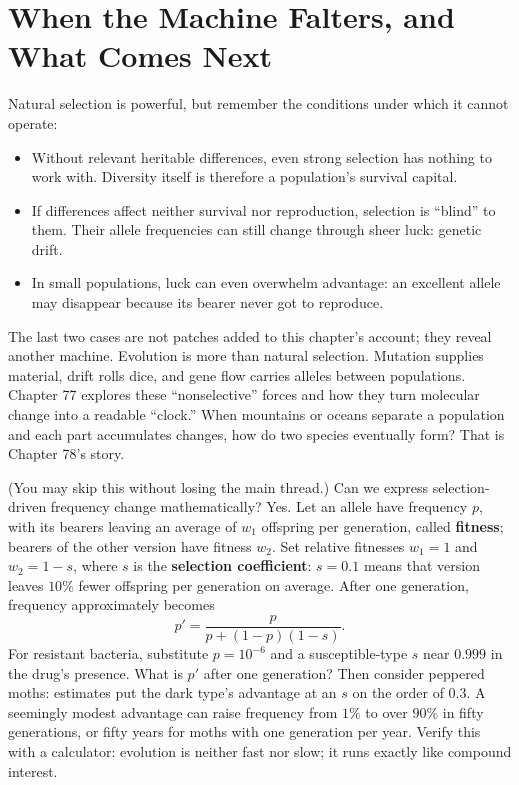 \section{When the Machine Falters, and What Comes Next}

Natural selection is powerful, but remember the conditions under which it cannot operate:

\begin{itemize}[itemsep=2pt]
\item Without relevant heritable differences, even strong selection has nothing to work with. Diversity itself is therefore a population's survival capital.
\item If differences affect neither survival nor reproduction, selection is ``blind'' to them. Their allele frequencies can still change through sheer luck: genetic drift.
\item In small populations, luck can even overwhelm advantage: an excellent allele may disappear because its bearer never got to reproduce.
\end{itemize}

The last two cases are not patches added to this chapter's account; they reveal another machine. Evolution is more than natural selection. Mutation supplies material, drift rolls dice, and gene flow carries alleles between populations. Chapter 77 explores these ``nonselective'' forces and how they turn molecular change into a readable ``clock.'' When mountains or oceans separate a population and each part accumulates changes, how do two species eventually form? That is Chapter 78's story.

\begin{tiaozhan}
(You may skip this without losing the main thread.) Can we express selection-driven frequency change mathematically? Yes. Let an allele have frequency $p$, with its bearers leaving an average of $w_1$ offspring per generation, called \textbf{fitness}; bearers of the other version have fitness $w_2$. Set relative fitnesses $w_1 = 1$ and $w_2 = 1 - s$, where $s$ is the \textbf{selection coefficient}: $s = 0.1$ means that version leaves $10\%$ fewer offspring per generation on average. After one generation, frequency approximately becomes
\[
p' = \frac{p}{p + (1-p)(1-s)}.
\]
For resistant bacteria, substitute $p = 10^{-6}$ and a susceptible-type $s$ near $0.999$ in the drug's presence. What is $p'$ after one generation? Then consider peppered moths: estimates put the dark type's advantage at an $s$ on the order of $0.3$. A seemingly modest advantage can raise frequency from $1\%$ to over $90\%$ in fifty generations, or fifty years for moths with one generation per year. Verify this with a calculator: evolution is neither fast nor slow; it runs exactly like compound interest.
\end{tiaozhan}

